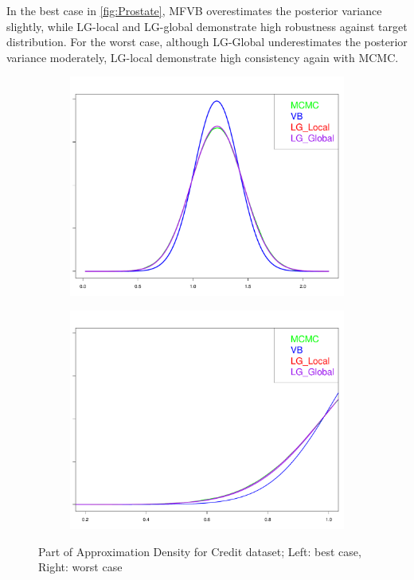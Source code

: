 In the best case in \autoref{fig:Prostate}, MFVB overestimates the posterior variance slightly, while LG-local and LG-global demonstrate high robustness against target distribution. For the worst case, although LG-Global underestimates the posterior variance moderately, LG-local demonstrate high consistency again with MCMC.\\
\begin{figure}[h]
	\begin{subfigure}{0.5\textwidth}
		\centering
		\includegraphics[page = 11, width=\linewidth,keepaspectratio]{lasso_densities_Credit.pdf}
	\end{subfigure}
	\begin{subfigure}{0.5\textwidth}
		\includegraphics[page = 2, width=\linewidth,keepaspectratio]{lasso_densities_Credit-1.pdf}
	\end{subfigure}
	\caption{Part of Approximation Density for Credit dataset; Left: best case, Right: worst case}
	\label{fig:Credit}
\end{figure}
